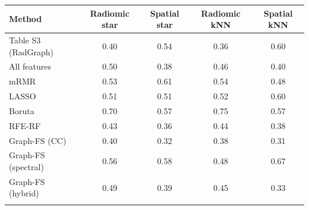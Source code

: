 \begin{tabular}{@{}lcccc@{}}
\toprule
Method & Radiomic star & Spatial star & Radiomic kNN & Spatial kNN \\
\midrule
Table S3 (RadGraph) & 0.40 & 0.54 & 0.36 & 0.60 \\
All features & 0.50 & 0.38 & 0.46 & 0.40 \\
mRMR & 0.53 & 0.61 & 0.54 & 0.48 \\
LASSO & 0.51 & 0.51 & 0.52 & 0.60 \\
Boruta & 0.70 & 0.57 & 0.75 & 0.57 \\
RFE-RF & 0.43 & 0.36 & 0.44 & 0.38 \\
Graph-FS (CC) & 0.40 & 0.32 & 0.38 & 0.31 \\
Graph-FS (spectral) & 0.56 & 0.58 & 0.48 & 0.67 \\
Graph-FS (hybrid) & 0.49 & 0.39 & 0.45 & 0.33 \\
\botrule
\end{tabular}
